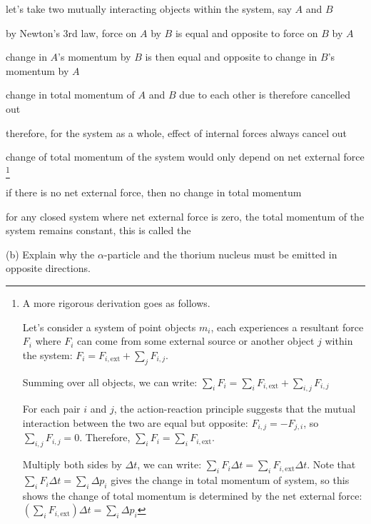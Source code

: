 let's take two mutually interacting objects within the system, say $A$ and $B$

by Newton's 3rd law, force on $A$ by $B$ is equal and opposite to force on $B$ by $A$

change in $A$'s momentum by $B$ is then equal and opposite to change in $B$'s momentum by $A$

change in total momentum of $A$ and $B$ due to each other is therefore cancelled out

therefore, for the system as a whole, effect of internal forces always cancel out

change of total momentum of the system would only depend on net external force
\footnote{A more rigorous derivation goes as follows.
	
	Let's consider a system of point objects $m_i$, each experiences a resultant force $F_i$ where $F_i$ can come from some external source or another object $j$ within the system: $F_i = F_{i,\text{ext}} + \sum_j F_{i,j}$.
	
	Summing over all objects, we can write: $\sum_i F_i = \sum_i F_{i,\text{ext}} + \sum_{i,j} F_{i,j}$ 
	
	For each pair $i$ and $j$, the action-reaction principle suggests that the mutual interaction between the two are equal but opposite: $F_{i,j} = -F_{j,i}$, so $\sum_{i,j} F_{i,j} = 0$. Therefore, $\sum_i F_i = \sum_i F_{i,\text{ext}}$.
	
	Multiply both sides by $\Delta t$, we can write: $\sum_i F_i \Delta t = \sum_i F_{i,\text{ext}} \Delta t$. Note that $\sum_i F_i \Delta t = \sum_i \Delta p_i$ gives the change in total momentum of system, so this shows the change of total momentum is determined by the net external force: $ \boxed{\left(\sum_i F_{i,\text{ext}} \right)\Delta t = \sum_i \Delta p_i}$}


if there is no net external force, then no change in total momentum

\begin{ilight}
	for any closed system where net external force is zero, the total momentum of the system remains constant, this is called the  
\end{ilight}

 (b) Explain why the $\alpha$-particle and the thorium nucleus must be emitted in opposite directions.

